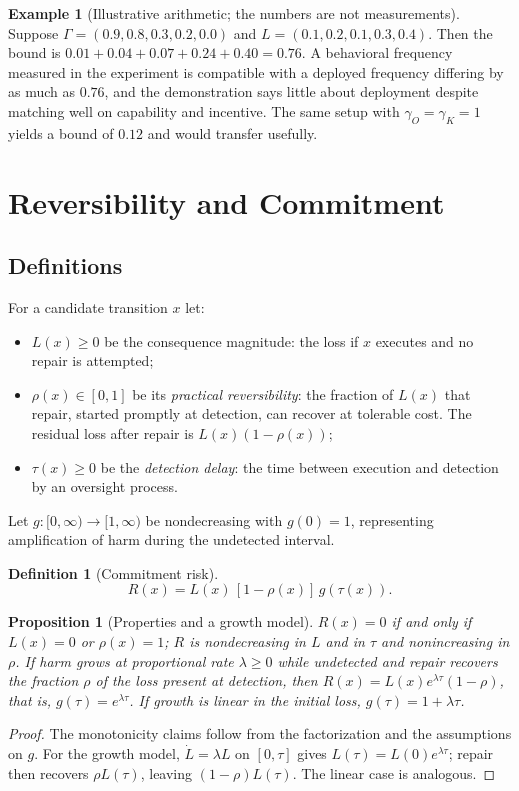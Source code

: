 \documentclass[11pt]{article}
\newtheorem{proposition}[theorem]{Proposition}
\theoremstyle{definition}
\newtheorem{definition}[theorem]{Definition}
\newtheorem{example}[theorem]{Example}
\begin{document}
\begin{example}[Illustrative arithmetic; the numbers are not measurements]
Suppose $\Gamma=(0.9,0.8,0.3,0.2,0.0)$ and $L=(0.1,0.2,0.1,0.3,0.4)$. Then the bound is $0.01+0.04+0.07+0.24+0.40=0.76$. A behavioral frequency measured in the experiment is compatible with a deployed frequency differing by as much as $0.76$, and the demonstration says little about deployment despite matching well on capability and incentive. The same setup with $\gamma_O=\gamma_K=1$ yields a bound of $0.12$ and would transfer usefully.
\end{example}

\section{Reversibility and Commitment}\label{app:D}

\subsection{Definitions}

For a candidate transition $x$ let:
\begin{itemize}[leftmargin=1.6em,itemsep=0.1em]
\item $L(x)\ge0$ be the consequence magnitude: the loss if $x$ executes and no repair is attempted;
\item $\rho(x)\in[0,1]$ be its \emph{practical reversibility}: the fraction of $L(x)$ that repair, started promptly at detection, can recover at tolerable cost. The residual loss after repair is $L(x)(1-\rho(x))$;
\item $\tau(x)\ge0$ be the \emph{detection delay}: the time between execution and detection by an oversight process.
\end{itemize}
Let $g:[0,\infty)\to[1,\infty)$ be nondecreasing with $g(0)=1$, representing amplification of harm during the undetected interval.

\begin{definition}[Commitment risk]
\[
R(x)=L(x)\,[1-\rho(x)]\,g(\tau(x)).
\]
\end{definition}

\begin{proposition}[Properties and a growth model]\label{prop:D1}
$R(x)=0$ if and only if $L(x)=0$ or $\rho(x)=1$; $R$ is nondecreasing in $L$ and in $\tau$ and nonincreasing in $\rho$. If harm grows at proportional rate $\lambda\ge0$ while undetected and repair recovers the fraction $\rho$ of the loss present at detection, then $R(x)=L(x)e^{\lambda\tau}(1-\rho)$, that is, $g(\tau)=e^{\lambda\tau}$. If growth is linear in the initial loss, $g(\tau)=1+\lambda\tau$.
\end{proposition}
\begin{proof}
The monotonicity claims follow from the factorization and the assumptions on $g$. For the growth model, $\dot L=\lambda L$ on $[0,\tau]$ gives $L(\tau)=L(0)e^{\lambda\tau}$; repair then recovers $\rho L(\tau)$, leaving $(1-\rho)L(\tau)$. The linear case is analogous.
\end{proof}
\end{document}
